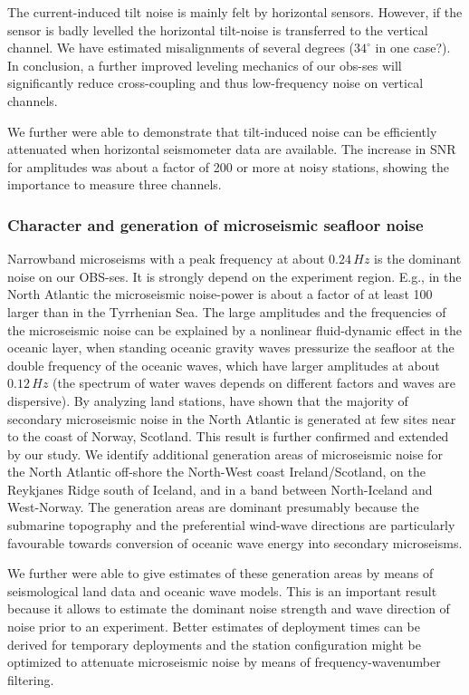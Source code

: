 \documentclass{article}
\begin{document}
{The current-induced tilt noise is 
mainly felt by horizontal sensors.
However, if the sensor is badly levelled the horizontal 
tilt-noise is transferred to the vertical channel.
We have estimated misalignments of several degrees ($34^{\circ}$ in 
one case?).
In conclusion, a further improved leveling mechanics of our obs-ses 
will significantly reduce cross-coupling and thus low-frequency noise on 
vertical channels.

We further were able to demonstrate that tilt-induced noise can be 
efficiently attenuated when horizontal seismometer data are available.
The increase in SNR for amplitudes was about a factor of 200 or more 
at noisy stations, showing the importance to measure three channels.

\subsubsection*{Character and generation of microseismic seafloor noise}

Narrowband microseisms with a peak frequency at about 
$0.24\, Hz$ is the dominant  noise on our OBS-ses.
It is strongly depend on the experiment region.
E.g., in 
the North Atlantic the microseismic noise-power
is about a factor of at least 100 larger than in the Tyrrhenian Sea.
The large amplitudes and the frequencies of the 
microseismic noise can be explained by a nonlinear fluid-dynamic 
effect in the oceanic layer, when 
standing oceanic gravity waves pressurize the seafloor    
at the double frequency of the oceanic waves, which have 
larger amplitudes at about $0.12\, Hz$
(the spectrum of water waves depends on different factors and waves are
dispersive).
By analyzing land stations, 
\cite{essen:03} have shown that 
the majority of secondary microseismic noise in the North Atlantic 
is generated at few sites near to the coast of Norway, Scotland.
This result is further confirmed and extended  by our study. 
We identify additional generation areas of microseismic noise 
for the North Atlantic 
off-shore the North-West coast Ireland/Scotland, 
on the Reykjanes Ridge south of Iceland,
and in a band between North-Iceland and West-Norway.
The generation areas are dominant presumably because 
the submarine topography and the preferential wind-wave directions
are particularly favourable towards conversion of oceanic wave energy 
into secondary microseisms.
  
We further were able to give estimates of these generation areas by means 
of seismological land data and oceanic wave models.
This is an important result because it allows to estimate the 
dominant noise strength and wave direction of noise prior to an experiment.
Better estimates of deployment times can be derived for temporary deployments and 
the station configuration might be optimized to attenuate microseismic noise
by means of frequency-wavenumber filtering.

}
\end{document}

